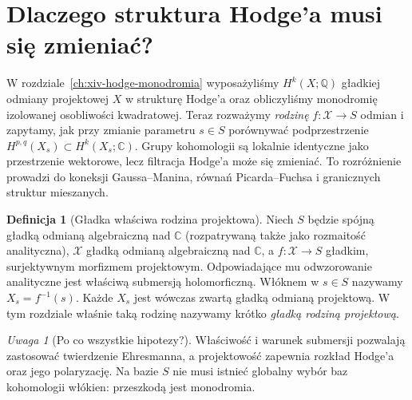 \documentclass[11pt,a4paper,oneside]{report}
\newcommand{\C}{\mathbb{C}}
\newcommand{\Q}{\mathbb{Q}}
\theoremstyle{plain}
\theoremstyle{definition}
\newtheorem{definicja}[twierdzenie]{Definicja}
\theoremstyle{remark}
\newtheorem{uwaga}[twierdzenie]{Uwaga}
\begin{document}
\section{Dlaczego struktura Hodge'a musi się zmieniać?}
W rozdziale~\ref{ch:xiv-hodge-monodromia} wyposażyliśmy
$H^k(X;\Q)$ gładkiej odmiany projektowej $X$ w strukturę Hodge'a
oraz obliczyliśmy monodromię izolowanej osobliwości kwadratowej.
Teraz rozważymy \emph{rodzinę} $f:\mathcal X\to S$ odmian i zapytamy,
jak przy zmianie parametru $s\in S$ porównywać podprzestrzenie
$H^{p,q}(X_s)\subset H^k(X_s;\C)$.
Grupy kohomologii są lokalnie identyczne jako przestrzenie wektorowe,
lecz filtracja Hodge'a może się zmieniać. To rozróżnienie prowadzi
do koneksji Gaussa--Manina, równań Picarda--Fuchsa i granicznych
struktur mieszanych.

\begin{definicja}[Gładka właściwa rodzina projektowa]
Niech $S$ będzie spójną gładką odmianą algebraiczną nad $\C$
(rozpatrywaną także jako rozmaitość analityczna),
$\mathcal X$ gładką odmianą algebraiczną nad $\C$,
a $f:\mathcal X\to S$ gładkim, surjektywnym morfizmem
projektowym. Odpowiadające mu odwzorowanie analityczne
jest właściwą submersją holomorficzną. Włóknem w $s\in S$ nazywamy
$X_s=f^{-1}(s)$. Każde $X_s$ jest wówczas zwartą gładką
odmianą projektową. W tym rozdziale właśnie taką rodzinę
nazywamy krótko \emph{gładką rodziną projektową}.
\end{definicja}
\begin{uwaga}[Po co wszystkie hipotezy?]
Właściwość i warunek submersji pozwalają zastosować twierdzenie
Ehresmanna, a projektowość zapewnia rozkład Hodge'a oraz
jego polaryzację. Na bazie $S$ nie musi istnieć globalny wybór
baz kohomologii włókien: przeszkodą jest monodromia.
\end{uwaga}
\end{document}
